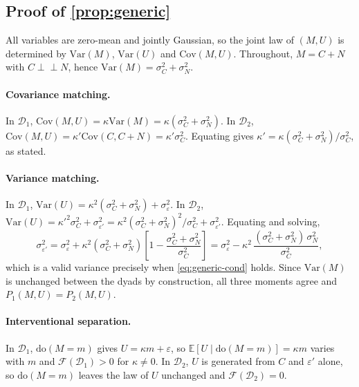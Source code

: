 \documentclass[11pt,a4paper]{article}
\theoremstyle{plain}
\theoremstyle{definition}
\theoremstyle{remark}
\newcommand{\Fc}{\mathcal{F}}
\newcommand{\Dy}{\mathcal{D}}
\newcommand{\dop}{\mathrm{do}}
\newcommand{\indep}{\perp\!\!\!\perp}
\newcommand{\Var}{\mathrm{Var}}
\newcommand{\Cov}{\mathrm{Cov}}
\newcommand{\Ex}{\mathbb{E}}
\begin{document}
\clearpage
\begin{appendices}

\section{Proof of \texorpdfstring{\cref{prop:generic}}{Proposition 2}}\label{app:proofs}

All variables are zero-mean and jointly Gaussian, so the joint law of $(M,U)$ is determined by
$\Var(M)$, $\Var(U)$ and $\Cov(M,U)$. Throughout, $M = C + N$ with $C \indep N$, hence
$\Var(M) = \sigma_C^2 + \sigma_N^2$.

\paragraph{Covariance matching.}
In $\Dy_1$, $\Cov(M,U) = \kappa \Var(M) = \kappa(\sigma_C^2 + \sigma_N^2)$. In $\Dy_2$,
$\Cov(M,U) = \kappa' \Cov(C, C+N) = \kappa' \sigma_C^2$. Equating gives
$\kappa' = \kappa(\sigma_C^2 + \sigma_N^2)/\sigma_C^2$, as stated.

\paragraph{Variance matching.}
In $\Dy_1$, $\Var(U) = \kappa^2(\sigma_C^2 + \sigma_N^2) + \sigma_\varepsilon^2$. In $\Dy_2$,
$\Var(U) = \kappa'^2 \sigma_C^2 + \sigma_{\varepsilon'}^2
= \kappa^2 (\sigma_C^2 + \sigma_N^2)^2/\sigma_C^2 + \sigma_{\varepsilon'}^2$. Equating and solving,
\[
\sigma_{\varepsilon'}^2
= \sigma_\varepsilon^2 + \kappa^2(\sigma_C^2+\sigma_N^2)\left[1 - \frac{\sigma_C^2+\sigma_N^2}{\sigma_C^2}\right]
= \sigma_\varepsilon^2 - \kappa^2\,\frac{(\sigma_C^2+\sigma_N^2)\,\sigma_N^2}{\sigma_C^2},
\]
which is a valid variance precisely when \eqref{eq:generic-cond} holds. Since $\Var(M)$ is unchanged
between the dyads by construction, all three moments agree and $P_1(M,U) = P_2(M,U)$.

\paragraph{Interventional separation.}
In $\Dy_1$, $\dop(M{=}m)$ gives $U = \kappa m + \varepsilon$, so $\Ex[U \mid \dop(M{=}m)] = \kappa m$
varies with $m$ and $\Fc(\Dy_1) > 0$ for $\kappa \neq 0$. In $\Dy_2$, $U$ is generated from $C$ and
$\varepsilon'$ alone, so $\dop(M{=}m)$ leaves the law of $U$ unchanged and $\Fc(\Dy_2) = 0$.


\end{appendices}
\end{document}
